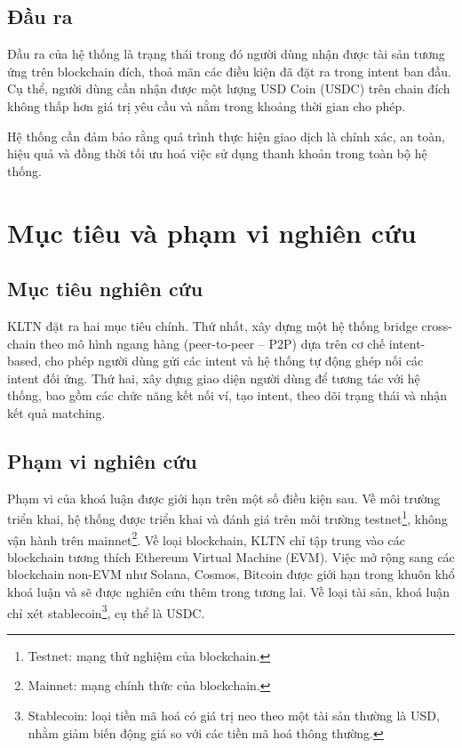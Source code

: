 \subsection{Đầu ra}

Đầu ra của hệ thống là trạng thái trong đó người dùng nhận được tài sản tương ứng trên blockchain đích, thoả mãn các điều kiện đã đặt ra trong intent ban đầu. Cụ thể, người dùng cần nhận được một lượng USD Coin (USDC) trên chain đích không thấp hơn giá trị yêu cầu và nằm trong khoảng thời gian cho phép.

Hệ thống cần đảm bảo rằng quá trình thực hiện giao dịch là chính xác, an toàn, hiệu quả và đồng thời tối ưu hoá việc sử dụng thanh khoản trong toàn bộ hệ thống.

\section{Mục tiêu và phạm vi nghiên cứu}

\subsection{Mục tiêu nghiên cứu}

KLTN đặt ra hai mục tiêu chính. Thứ nhất, xây dựng một hệ thống bridge cross-chain theo mô hình ngang hàng (peer-to-peer -- P2P) dựa trên cơ chế intent-based, cho phép người dùng gửi các intent và hệ thống tự động ghép nối các intent đối ứng. Thứ hai, xây dựng giao diện người dùng để tương tác với hệ thống, bao gồm các chức năng kết nối ví, tạo intent, theo dõi trạng thái và nhận kết quả matching.

\subsection{Phạm vi nghiên cứu}

Phạm vi của khoá luận được giới hạn trên một số điều kiện sau. Về môi trường triển khai, hệ thống được triển khai và đánh giá trên môi trường 
testnet\footnote{Testnet: mạng thử nghiệm của blockchain.}, không vận hành trên 
mainnet\footnote{Mainnet: mạng chính thức của blockchain.}.
Về loại blockchain, KLTN chỉ tập trung vào các blockchain tương thích Ethereum Virtual Machine (EVM).
Việc mở rộng sang các blockchain non-EVM như Solana, Cosmos, Bitcoin được giới hạn trong khuôn khổ khoá luận và sẽ được nghiên cứu thêm trong tương lai.
Về loại tài sản, khoá luận chỉ xét 
stablecoin\footnote{Stablecoin: loại tiền mã hoá có giá trị neo theo một tài sản thường là USD, nhằm giảm biến động giá so với các tiền mã hoá thông thường.}, cụ thể là USDC.

